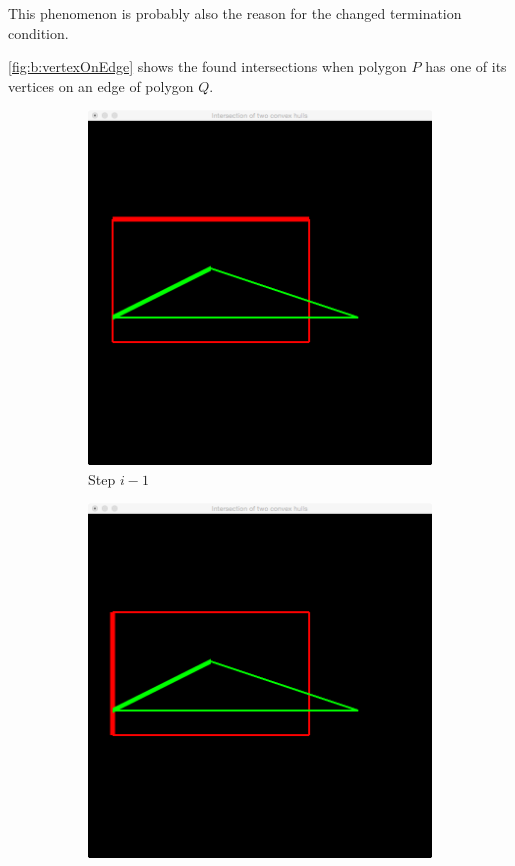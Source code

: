 	This phenomenon is probably also the reason for the changed termination condition. 

	\autoref{fig:b:vertexOnEdge} shows the found intersections when polygon $P$ has one of its vertices on an edge of polygon $Q$.

		\begin{figure}
			\begin{subfigure}{0.24\textwidth}
				\includegraphics[width=\textwidth]{./img/b_step_0_deg_one}
				\caption{Step $i - 1$}
				\label{subfig:b:vertexOnEdge:step0}			
			\end{subfigure}		
			\begin{subfigure}{0.24\textwidth}
				\includegraphics[width=\textwidth]{./img/b_step_1_deg_one}

\end{subfigure}
\end{figure}
